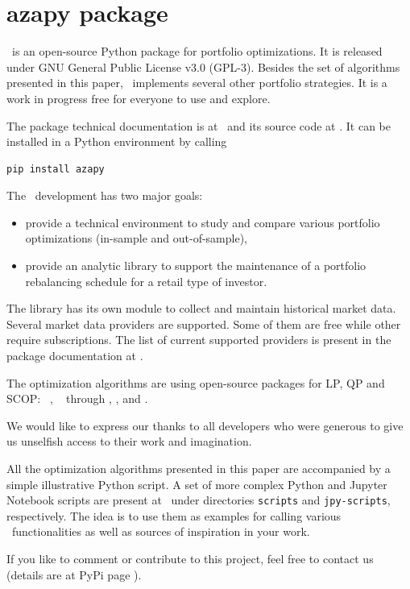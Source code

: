 
\section{azapy package}\label{AZAPY}

\azapy\ is an open-source Python package for portfolio optimizations.
It is released under GNU General Public License v3.0 (GPL-3).
Besides the set of algorithms presented in this paper, \azapy\ implements several other
portfolio strategies. It is a work in progress free for everyone to use and explore.

The package technical documentation is at  \azapydoc\ and its source code at
\azapycode.
It can be installed in a Python environment by calling
\begin{lstlisting}[language=Python]
    pip install azapy
\end{lstlisting}
The \azapy\ development has two major goals:
\begin{itemize}
  \item provide a technical environment to study and compare various portfolio optimizations (in-sample and out-of-sample),
  \item provide an analytic library to support the maintenance of a portfolio rebalancing schedule for a retail type of investor.
\end{itemize}

The library has its own module to collect and maintain historical market data. Several market data providers
are supported. Some of them are free while other require subscriptions.
The list of current supported providers is present in the package documentation at \azapydoc.

The optimization algorithms are using open-source packages for LP, QP and SCOP:
\ecos~\cite{ecos}, \highs~\cite{highs-ds} through \linprog, \cvxopt, and \glpk.

We would like to express our thanks to all developers who were generous to give us unselfish access to their work and imagination.

All the optimization algorithms presented in this paper are accompanied by a simple illustrative Python script.
A set of more complex Python and Jupyter Notebook scripts are present at \azapycode\ under directories {\tt scripts} and {\tt jpy-scripts}, respectively.
The idea is to use them as examples for calling various \azapy\ functionalities as well as sources of inspiration in your work.

If you like to comment or contribute to this project, feel free to contact us (details are at PyPi page \azapy).

\BackToContents 